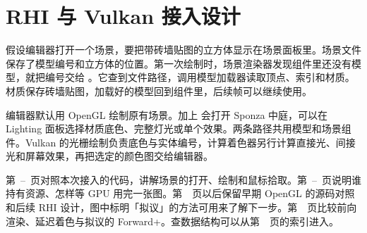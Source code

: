 

\geometry{a4paper,left=22mm,right=22mm,top=19mm,bottom=19mm}
\setlength{\headwidth}{\textwidth}
\newcommand{\sample}[1]{\par\smallskip{\noindent\sffamily\fontsize{10.4}{14}\selectfont\bfseries\color{Teal}#1\par}\nobreak}
\newcommand{\termenglish}[1]{\,{\normalfont\sffamily\fontsize{9}{11}\selectfont\color{Muted}(#1)}}
\newcommand{\termaside}[3]{\par\noindent
  \begin{minipage}[t]{.66\linewidth}\raggedright\setlength{\parindent}{2\ccwd}\indent #1\par\end{minipage}\hfill
  \begin{minipage}[t]{.29\linewidth}\raggedright\sffamily\fontsize{9.4}{13.8}\selectfont\color{Muted}
    {\color{Rule}\rule[.35ex]{5mm}{.6pt}}\enspace #2\par\smallskip #3\par
  \end{minipage}\par}

\bodytype
\setlength{\parindent}{2\ccwd}
\setlength{\parskip}{\baselineskip}
\section{RHI 与 Vulkan 接入设计}
假设编辑器打开一个场景，要把带砖墙贴图的立方体显示在场景面板里。场景文件保存了模型编号和立方体的位置。第一次绘制时，场景渲染器发现组件里还没有模型，就把编号交给 。它查到文件路径，调用模型加载器读取顶点、索引和材质。材质保存砖墙贴图，加载好的模型回到组件里，后续帧可以继续使用。

编辑器默认用 OpenGL 绘制原有场景。加上  会打开 Sponza 中庭，可以在 Lighting 面板选择材质底色、完整灯光或单个效果。两条路径共用模型和场景组件。Vulkan 的光栅绘制负责底色与实体编号，计算着色器另行计算直接光、间接光和屏幕效果，再把选定的颜色图交给编辑器。


第~\pageref{impl:entry}--\pageref{impl:fix}~页对照本次接入的代码，讲解场景的打开、绘制和鼠标拾取。第~\pageref{sec:ownership}--\pageref{sec:ownership-fence}~页说明谁持有资源、怎样等 GPU 用完一张图。第~\pageref{sec:model}~页以后保留早期 OpenGL 的源码对照和后续 RHI 设计，图中标明「拟议」的方法可用来了解下一步。第~\pageref{sec:lighting-paths}~页比较前向渲染、延迟着色与拟议的 Forward+。查数据结构可以从第~\pageref{sec:data-guide}~页的索引进入。

